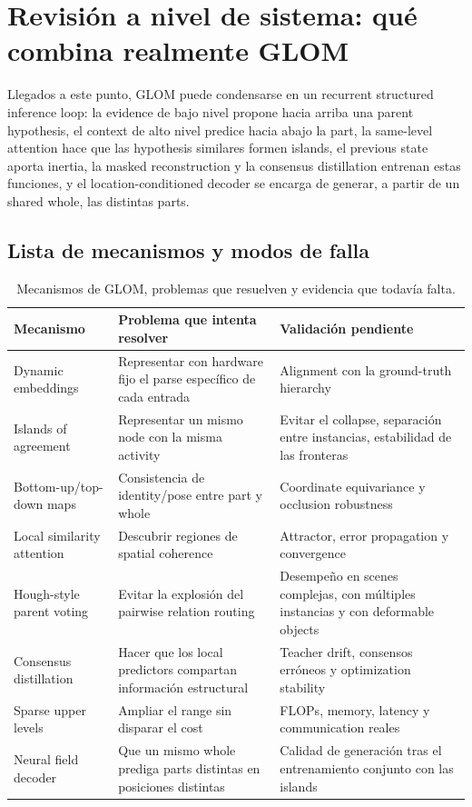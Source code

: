\section{Revisión a nivel de sistema: qué combina realmente GLOM}

Llegados a este punto, GLOM puede condensarse en un recurrent structured inference loop: la evidence de bajo nivel propone hacia arriba una parent hypothesis, el context de alto nivel predice hacia abajo la part, la same-level attention hace que las hypothesis similares formen islands, el previous state aporta inertia, la masked reconstruction y la consensus distillation entrenan estas funciones, y el location-conditioned decoder se encarga de generar, a partir de un shared whole, las distintas parts.


\subsection{Lista de mecanismos y modos de falla}

\begin{table}[H]
\centering
\small
\caption{Mecanismos de GLOM, problemas que resuelven y evidencia que todavía falta.}
\begin{tabularx}{\textwidth}{L{0.20\textwidth}L{0.30\textwidth}>{\raggedright\arraybackslash}X}
\toprule
Mecanismo & Problema que intenta resolver & Validación pendiente \\
\midrule
Dynamic embeddings & Representar con hardware fijo el parse específico de cada entrada & Alignment con la ground-truth hierarchy \\
Islands of agreement & Representar un mismo node con la misma activity & Evitar el collapse, separación entre instancias, estabilidad de las fronteras \\
Bottom-up/top-down maps & Consistencia de identity/pose entre part y whole & Coordinate equivariance y occlusion robustness \\
Local similarity attention & Descubrir regiones de spatial coherence & Attractor, error propagation y convergence \\
Hough-style parent voting & Evitar la explosión del pairwise relation routing & Desempeño en scenes complejas, con múltiples instancias y con deformable objects \\
Consensus distillation & Hacer que los local predictors compartan información estructural & Teacher drift, consensos erróneos y optimization stability \\
Sparse upper levels & Ampliar el range sin disparar el cost & FLOPs, memory, latency y communication reales \\
Neural field decoder & Que un mismo whole prediga parts distintas en posiciones distintas & Calidad de generación tras el entrenamiento conjunto con las islands \\
\bottomrule
\end{tabularx}
\end{table}

